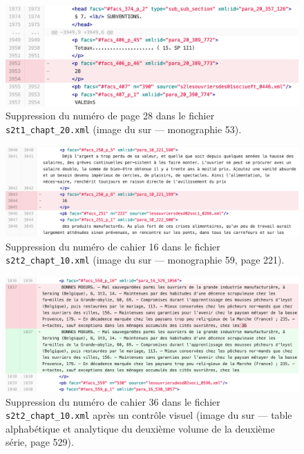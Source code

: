 \begin{figure}
    \centering
    \includegraphics[width=15cm]{img/suppr_num_page.png}
    \caption[Suppression d'un numéro de page]{Suppression du numéro de page 28 dans le fichier  \texttt{s2t1\_chapt\_20.xml} (image du \commit{} sur \gitlab{} --- monographie \no{} 53).}
    \label{fig:supprnumpage}
\end{figure}

\begin{figure}
    \centering
    \includegraphics[width=16cm]{img/suppr_num _cahier.png}
    \caption[Suppression d'un numéro de cahier (1)]{Suppression du numéro de cahier 16 dans le fichier  \texttt{s2t2\_chapt\_10.xml} (image du \commit{} sur \gitlab{} --- monographie \no{} 59, page 221).}
    \label{fig:suppnumcahier}
\end{figure}

\begin{figure}
    \centering
    \includegraphics[width=16cm]{img/suppr_num _cahier_visuel.png}
    \caption[Suppression d'un numéro de cahier (2)]{Suppression du numéro de cahier 36 dans le fichier  \texttt{s2t2\_chapt\_10.xml} après un contrôle visuel (image du \commit{} sur \gitlab{} --- table alphabétique et analytique du deuxième volume de la deuxième série, page 529).}
    \label{fig:suppnumcahiervisu}
\end{figure}


